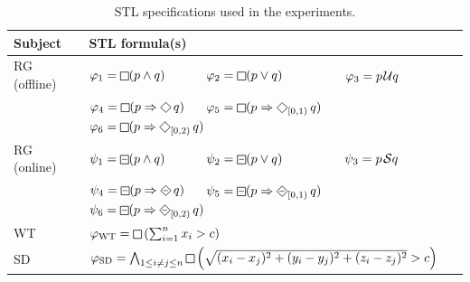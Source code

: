 \begin{table}[t]
	\centering
		\begin{tabular}{|l|l|}
			\hline
			Subject & STL formula(s) \\
			\hline
			RG (offline) & $\varphi_1 =\LTLg (p \wedge q)$ \,\,\,\,\,\,\,\,\,\,\,\,\,\,\, $\varphi_2 =\LTLg (p \lor q)$ \,\,\,\,\,\,\,\,\,\,\,\,\,\,\,\,\,\,\,\,\,\,\,\,\, $\varphi_3 = p \kern.1em\mathcal{U} q$ \\
			& $\varphi_4 = \LTLg (p \Rightarrow \LTLf q)$  \,\,\,\,\,\,  $\varphi_5 = \LTLg (p \Rightarrow \LTLf_{[0,1)} q)$ \,\,\,\,\,\, $\varphi_6 = \LTLg (p \Rightarrow \LTLf_{[0,2)} q)$ \\
			RG (online) & $\psi_1 =\LTLsquareminus (p \wedge q)$ \,\,\,\,\,\,\,\,\,\,\,\,\,\,\, $\psi_2 =\LTLsquareminus (p \lor q)$ \,\,\,\,\,\,\,\,\,\,\,\,\,\,\,\,\,\,\,\,\,\,\,\,\, $\psi_3 = p \kern.1em\mathcal{S} q$ \\
			& $\psi_4 = \LTLsquareminus (p \Rightarrow \LTLdiamondminus q)$  \,\,\,\,\,\,  $\psi_5 = \LTLsquareminus (p \Rightarrow \LTLdiamondminus_{[0,1)} q)$ \,\,\,\,\,\, $\psi_6 = \LTLsquareminus (p \Rightarrow \LTLdiamondminus_{[0,2)} q)$ \\
			WT & $\varphi_{\text{WT}} = \LTLg \left(\sum_{i=1}^{n} x_i  > c\right)$  \\
			SD & $\varphi_{\text{SD}} = \bigwedge_{1 \leq i \neq j \leq n} \LTLg \left( \sqrt{(x_i-x_j)^2 + (y_i-y_j)^2 + (z_i-z_j)^2} > c \right)$   \\
			\hline
	\end{tabular}%
	\caption{STL specifications used in the experiments.}
	\label{tab:spec} 
\end{table}

